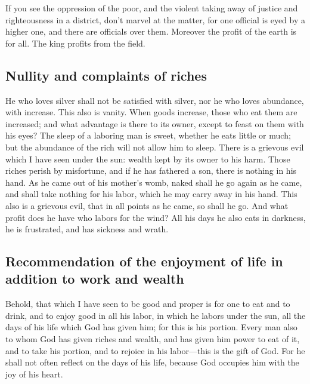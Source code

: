  If you see the oppression of the poor, and the violent
taking away of justice and righteousness in a district, don't marvel at
the matter, for one official is eyed by a higher one, and there are
officials over them.  Moreover the profit of the earth is
for all. The king profits from the field.

\hypertarget{nullity-and-complaints-of-riches}{%
\subsection{Nullity and complaints of
riches}\label{nullity-and-complaints-of-riches}}

 He who loves silver shall not be satisfied with silver,
nor he who loves abundance, with increase. This also is vanity.
 When goods increase, those who eat them are increased;
and what advantage is there to its owner, except to feast on them with
his eyes?  The sleep of a laboring man is sweet, whether
he eats little or much; but the abundance of the rich will not allow him
to sleep.  There is a grievous evil which I have seen
under the sun: wealth kept by its owner to his harm. 
Those riches perish by misfortune, and if he has fathered a son, there
is nothing in his hand.  As he came out of his mother's
womb, naked shall he go again as he came, and shall take nothing for his
labor, which he may carry away in his hand.  This also is
a grievous evil, that in all points as he came, so shall he go. And what
profit does he have who labors for the wind?  All his
days he also eats in darkness, he is frustrated, and has sickness and
wrath.

\hypertarget{recommendation-of-the-enjoyment-of-life-in-addition-to-work-and-wealth}{%
\subsection{Recommendation of the enjoyment of life in addition to work
and
wealth}\label{recommendation-of-the-enjoyment-of-life-in-addition-to-work-and-wealth}}

 Behold, that which I have seen to be good and proper is
for one to eat and to drink, and to enjoy good in all his labor, in
which he labors under the sun, all the days of his life which God has
given him; for this is his portion.  Every man also to
whom God has given riches and wealth, and has given him power to eat of
it, and to take his portion, and to rejoice in his labor---this is the
gift of God.  For he shall not often reflect on the days
of his life, because God occupies him with the joy of his heart.

